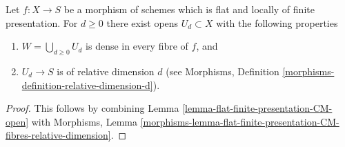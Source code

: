 \begin{lemma}
\label{lemma-flat-finite-presentation-CM-pieces}
Let $f : X \to S$ be a morphism of schemes which is flat and locally
of finite presentation. For $d \geq 0$ there exist opens $U_d \subset X$
with the following properties
\begin{enumerate}
\item $W = \bigcup_{d \geq 0} U_d$ is dense in every fibre of $f$, and
\item $U_d \to S$ is of relative dimension $d$ (see
Morphisms, Definition \ref{morphisms-definition-relative-dimension-d}).
\end{enumerate}
\end{lemma}

\begin{proof}
This follows by combining
Lemma \ref{lemma-flat-finite-presentation-CM-open}
with
Morphisms, Lemma
\ref{morphisms-lemma-flat-finite-presentation-CM-fibres-relative-dimension}.
\end{proof}
